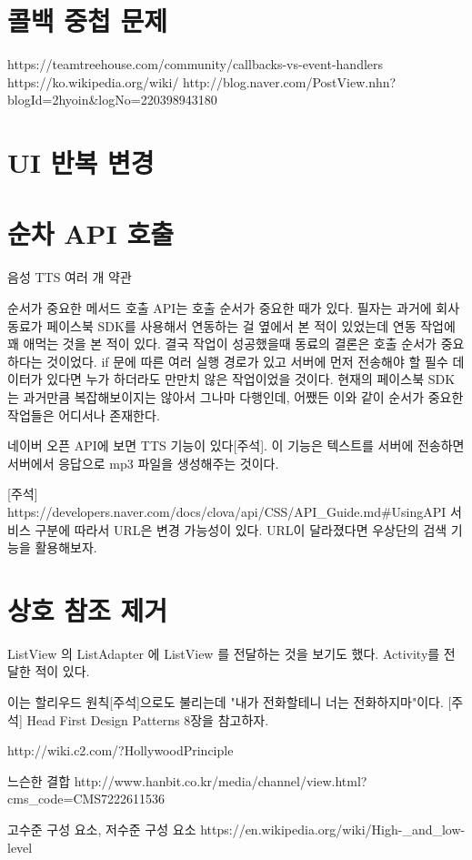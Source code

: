 \documentclass{book}
\begin{document}
\section{콜백 중첩 문제}
https://teamtreehouse.com/community/callbacks-vs-event-handlers
https://ko.wikipedia.org/wiki/%
http://blog.naver.com/PostView.nhn?blogId=2hyoin&logNo=220398943180

\section{UI 반복 변경}

\section{순차 API 호출}
음성 TTS
여러 개 약관

순서가 중요한 메서드 호출
API는 호출 순서가 중요한 때가 있다. 필자는 과거에 회사 동료가 페이스북 SDK를 사용해서 연동하는 걸 옆에서 본 적이 있었는데 연동 작업에 꽤 애먹는 것을 본 적이 있다. 결국 작업이 성공했을때 동료의 결론은 호출 순서가 중요하다는 것이었다. if 문에 따른 여러 실행 경로가 있고 서버에 먼저 전송해야 할 필수 데이터가 있다면 누가 하더라도 만만치 않은 작업이었을 것이다. 현재의 페이스북 SDK는 과거만큼 복잡해보이지는 않아서 그나마 다행인데, 어쨌든 이와 같이 순서가 중요한 작업들은 어디서나 존재한다. 

네이버 오픈 API에 보면 TTS 기능이 있다[주석]. 이 기능은 텍스트를 서버에 전송하면 서버에서 응답으로 mp3 파일을 생성해주는 것이다.

[주석] https://developers.naver.com/docs/clova/api/CSS/API_Guide.md#UsingAPI 서비스 구분에 따라서 URL은 변경 가능성이 있다. URL이 달라졌다면 우상단의 검색 기능을 활용해보자.


\section{상호 참조 제거}
ListView 의 ListAdapter 에 ListView 를 전달하는 것을 보기도 했다.
Activity를 전달한 적이 있다.


이는 할리우드 원칙[주석]으로도 불리는데  "내가 전화할테니 너는 전화하지마"이다.
[주석] Head First Design Patterns 8장을 참고하자.

http://wiki.c2.com/?HollywoodPrinciple

느슨한 결합
http://www.hanbit.co.kr/media/channel/view.html?cms_code=CMS7222611536

고수준 구성 요소, 저수준 구성 요소
https://en.wikipedia.org/wiki/High-_and_low-level
\end{document}
